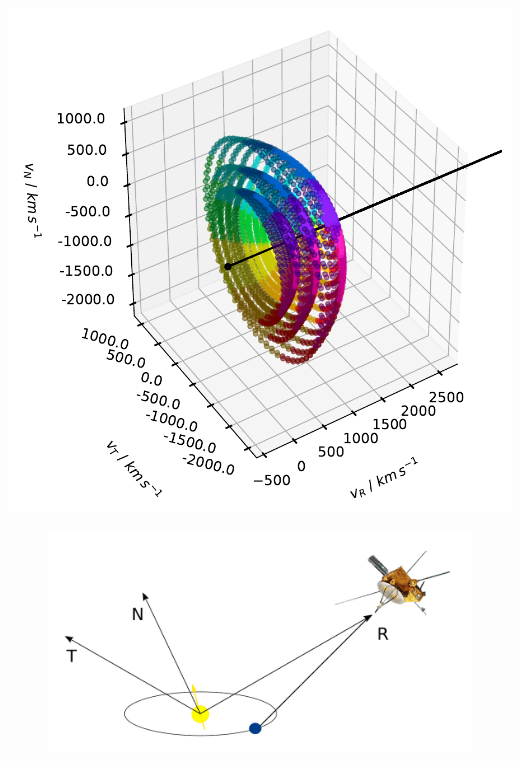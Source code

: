 \documentclass{beamer}
\begin{document}


\begin{frame}{}
\includegraphics[scale=0.35]{Pics/coll_3shells.pdf}
\end{frame}



\begin{frame}{}
\begin{figure}
	\includegraphics[scale=0.3]{Pics/RTN_AA.pdf}
\end{figure}
\end{frame}

\end{document}
